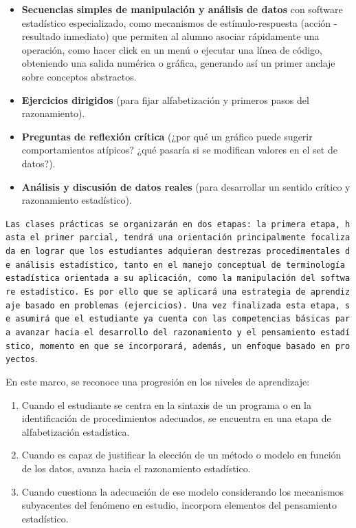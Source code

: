 \documentclass[
  spanish,
  letterpaper,
  DIV=11,
  numbers=noendperiod]{scrreprt}
\providecommand{\tightlist}{%
  \setlength{\itemsep}{0pt}\setlength{\parskip}{0pt}}
\begin{document}
\begin{itemize}
\tightlist
\item
  \textbf{Secuencias simples de manipulación y análisis de datos} con
  software estadístico especializado, como mecanismos de
  estímulo-respuesta (acción - resultado inmediato) que permiten al
  alumno asociar rápidamente una operación, como hacer click en un menú
  o ejecutar una línea de código, obteniendo una salida numérica o
  gráfica, generando así un primer anclaje sobre conceptos abstractos.
\item
  \textbf{Ejercicios dirigidos} (para fijar alfabetización y primeros
  pasos del razonamiento).
\item
  \textbf{Preguntas de reflexión crítica} (¿por qué un gráfico puede
  sugerir comportamientos atípicos? ¿qué pasaría si se modifican valores
  en el set de datos?).
\item
  \textbf{Análisis y discusión de datos reales} (para desarrollar un
  sentido crítico y razonamiento estadístico).
\end{itemize}

\texttt{Las\ clases\ prácticas\ se\ organizarán\ en\ dos\ etapas:\ la\ primera\ etapa,\ hasta\ el\ primer\ parcial,\ tendrá\ una\ orientación\ principalmente\ focalizada\ en\ lograr\ que\ los\ estudiantes\ adquieran\ destrezas\ procedimentales\ de\ análisis\ estadístico,\ tanto\ en\ el\ manejo\ conceptual\ de\ terminología\ estadística\ orientada\ a\ su\ aplicación,\ como\ la\ manipulación\ del\ software\ estadístico.\ Es\ por\ ello\ que\ se\ aplicará\ una\ estrategia\ de\ aprendizaje\ basado\ en\ problemas\ (ejercicios).\ Una\ vez\ finalizada\ esta\ etapa,\ se\ asumirá\ que\ el\ estudiante\ ya\ cuenta\ con\ las\ competencias\ básicas\ para\ avanzar\ hacia\ el\ desarrollo\ del\ razonamiento\ y\ el\ pensamiento\ estadístico,\ momento\ en\ que\ se\ incorporará,\ además,\ un\ enfoque\ basado\ en\ proyectos}.

En este marco, se reconoce una progresión en los niveles de aprendizaje:

\begin{enumerate}
\def\labelenumi{\arabic{enumi}.}
\tightlist
\item
  Cuando el estudiante se centra en la sintaxis de un programa o en la
  identificación de procedimientos adecuados, se encuentra en una etapa
  de alfabetización estadística.
\item
  Cuando es capaz de justificar la elección de un método o modelo en
  función de los datos, avanza hacia el razonamiento estadístico.
\item
  Cuando cuestiona la adecuación de ese modelo considerando los
  mecanismos subyacentes del fenómeno en estudio, incorpora elementos
  del pensamiento estadístico.
\end{enumerate}
\end{document}
